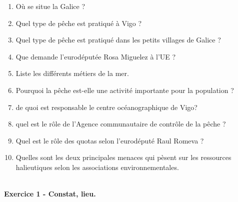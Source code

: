 \documentclass[12pt]{article}
\begin{document}
\vfill

\begin{enumerate}
\item Où se situe la Galice ?
\item Quel type de pêche est pratiqué à Vigo ?
\item Quel type de pêche est pratiqué dans les petits villages de Galice ?
 \item Que demande l'eurodéputée Rosa Miguelez à l'UE ?
\item Liste les différents métiers de la mer.
\item Pourquoi la pêche est-elle une activité importante pour la population ?
\item de quoi est responsable le centre océanographique de Vigo?
\item quel est le rôle de l'Agence communautaire de contrôle de la pêche ?
\item Quel est le rôle des quotas  selon l'eurodéputé Raul Romeva ?
\item Quelles sont les deux principales menaces qui pèsent sur les ressources halieutiques selon les associations environnementales.
\end{enumerate}

\newpage
{}\\

\textbf{Exercice 1 - Constat, lieu.}\\
\end{document}
